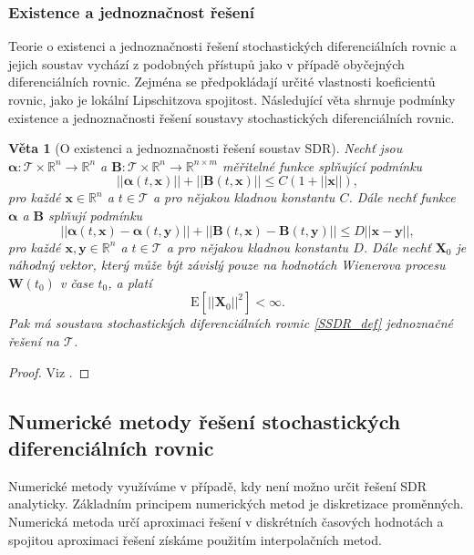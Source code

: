 \documentclass[a4paper,12pt]{report}
\newtheorem{veta}{Věta}
\theoremstyle{definition} \newtheorem{definice}[veta]{Definice}
\theoremstyle{remark}
\begin{document}
\subsubsection{Existence a jednoznačnost řešení}
Teorie o existenci a jednoznačnosti řešení stochastických diferenciálních rovnic a jejich soustav vychází z podobných přístupů jako v případě obyčejných diferenciálních rovnic.
Zejména se předpokládají určité vlastnosti koeficientů rovnic, jako je lokální Lipschitzova spojitost.
Následující věta shrnuje podmínky existence a jednoznačnosti řešení soustavy stochastických diferenciálních rovnic.
\begin{veta}[O existenci a jednoznačnosti řešení soustav SDR]
Nechť jsou $\boldsymbol\alpha:\mathcal{T}\times\mathbb{R}^n\to\mathbb{R}^n$ a $\boldsymbol{B}:\mathcal{T}\times\mathbb{R}^n\to\mathbb{R}^{n\times m}$ měřitelné funkce splňující podmínku
\begin{equation}\label{glob_Lipschitzova_podminka}
||\boldsymbol\alpha( t,\boldsymbol x)||+||\boldsymbol{B}( t,\boldsymbol x)||\leq C(1+{||\boldsymbol x||}),
\end{equation}
pro každé $\boldsymbol x\in\mathbb{R}^n$ a $t\in \mathcal{T}$ a pro nějakou kladnou konstantu $C$.
Dále nechť funkce $\boldsymbol\alpha$ a $\boldsymbol B$ splňují podmínku
\begin{equation}\label{loc_Lipschitzova_podminka}
||\boldsymbol\alpha( t,\boldsymbol x)-\boldsymbol\alpha( t,\boldsymbol y)||+||\boldsymbol{B}( t,\boldsymbol x)-\boldsymbol{B}( t,\boldsymbol y)||\leq D||\boldsymbol x-\boldsymbol y||,
\end{equation}
pro každé $\boldsymbol x , \boldsymbol y\in\mathbb{R}^n$ a $t\in \mathcal{T}$ a pro nějakou kladnou konstantu $D$.
Dále nechť $\boldsymbol X_0$ je náhodný vektor, který může být závislý pouze na hodnotách Wienerova procesu $\boldsymbol W(t_0)$ v čase $t_0$, %
a platí
\begin{equation}\label{podminka_tri}
\mathrm{E}\left[||\boldsymbol X_0||^2\right]<\infty.
\end{equation} 
Pak má soustava stochastických diferenciálních rovnic \eqref{SSDR_def} jednoznačné řešení na $\mathcal{T}$.
\end{veta}
\begin{proof}
Viz \cite{oksendal2003stochastic}.
\end{proof}

\subsection{Numerické metody řešení stochastických diferenciálních rovnic}\label{numericke_metody_kap}
Numerické metody využíváme v případě, kdy není možno určit řešení SDR analyticky.
Základním principem numerických metod je diskretizace proměnných.
Numerická metoda určí aproximaci řešení v diskrétních časových hodnotách a spojitou aproximaci řešení získáme použitím interpolačních metod.
\end{document}
